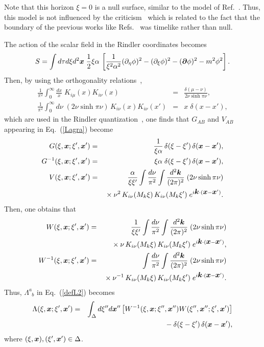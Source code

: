 \documentclass[12pt,epsf]{article}
\def\sp{\phantom{a}}
\def\bmi#1{\mbox{\boldmath $#1$}}
\begin{document}
Note that this horizon $\xi=0$ is a null surface,
similar to the model of Ref.~\cite{MuSeKo98}.
Thus, this model is not influenced by
the criticism~\cite{FroNov93} which is related
to the fact that the boundary of
the previous works like Refs.~\cite{BKLS86,Sredni93}
was timelike rather than null.

The action of the scalar field in the Rindler coordinates
becomes
\begin{equation}
 S = \int d\tau d\xi d^2\bmi{x}\;\frac{1}{2} 
    \xi \alpha\,\left[ \frac{1}{\xi^2\alpha^2}
   (\partial_\eta\phi)^2-(\partial_\xi\phi)^2
  -(\bmi{\partial}\phi)^2-m^2\phi^2 \right].
\end{equation}
Then, by using the orthogonality relations~\cite{Erdely54},
\begin{eqnarray}
 \frac{1}{\pi^2}\int_0^{\infty}\frac{dx}{x}\;
   K_{i\mu}(x)K_{i\nu}(x)
   &=& \frac{\delta(\mu-\nu)}{2\nu\sinh\pi\nu}, \\
 \frac{1}{\pi^2}\int_0^{\infty}d\nu\;(2\nu\sinh\pi\nu)\,
   K_{i\nu}(x)K_{i\nu}(x')
   &=& x\;\delta(x-x'),
\label{ortho}
\end{eqnarray}
which are used in the Rindler quantization~\cite{Fullin73},
one finds that $G_{AB}$ and $V_{AB}$ appearing
in Eq.~(\ref{Lagra}) become
\begin{eqnarray}
  G(\xi,\bmi{x};\xi',\bmi{x}')&=& \frac{1}{\xi\alpha}
     \,\delta(\xi-\xi')\,\delta(\bmi{x}-\bmi{x}'), \\
  G^{-1}(\xi,\bmi{x};\xi',\bmi{x}')   &=&
   \xi\alpha\;\delta(\xi-\xi')\,\delta(\bmi{x}-\bmi{x}'), \\
  V(\xi,\bmi{x};\xi',\bmi{x}')&=& \frac{\alpha}{\xi\xi'}
    \int\frac{d\nu}{\pi^2}
     \int \frac{d^2\bmi{k}}{(2\pi)^2}
      \;(2\nu\sinh\pi\nu) \nonumber \\
    & & {}\times
    \nu^2\,K_{i\nu}(M_k\xi)\,K_{i\nu}(M_k\xi')
   \;e^{i\bmi{k}\cdot (\bmi{x}-\bmi{x}')}.
\end{eqnarray}
Then, one obtains that
\begin{eqnarray}
  W(\xi,\bmi{x};\xi',\bmi{x}') &=&\frac{1}{\xi\xi'}
    \int\frac{d\nu}{\pi^2}
     \int \frac{d^2\bmi{k}}{(2\pi)^2}
      \;(2\nu\sinh\pi\nu) \nonumber \\
    & & {}\times
    \nu \,K_{i\nu}(M_k\xi)\,K_{i\nu}(M_k\xi')
   \;e^{i\bmi{k}\cdot (\bmi{x}-\bmi{x}')}, \\
  W^{-1}(\xi,\bmi{x};\xi',\bmi{x}')&=&
   \int\frac{d\nu}{\pi^2}
     \int \frac{d^2\bmi{k}}{(2\pi)^2}
      \;(2\nu\sinh\pi\nu) \nonumber \\
    & & {}\times
      \nu^{-1} \,K_{i\nu}(M_k\xi)\,K_{i\nu}(M_k\xi')
   \;e^{i\bmi{k}\cdot (\bmi{x}-\bmi{x}')}.
\end{eqnarray}
Thus, $\Lambda^a_{\sp b}$ in Eq.~(\ref{defL2}) becomes
\begin{eqnarray}
  \Lambda(\xi,\bmi{x};\xi',\bmi{x}') &=& 
   \int_\Delta d\xi'' d\bmi{x}'' 
    \left[ W^{-1}(\xi,\bmi{x};\xi'',\bmi{x}'')
    W(\xi'',\bmi{x}'';\xi',\bmi{x}')  \right]  \nonumber \\
    & & \qquad\qquad\qquad\qquad
  {}-\delta(\xi-\xi')\,\delta(\bmi{x}-\bmi{x}'),
\end{eqnarray}
where $(\xi,\bmi{x}),(\xi',\bmi{x}')\in \Delta$.
\end{document}
